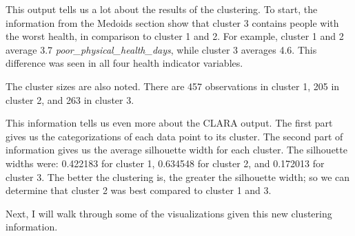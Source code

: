 \documentclass[12pt,twoside]{amherstthesis}
\begin{document}
  This output tells us a lot about the results of the clustering. To
  start, the information from the Medoids section show that cluster 3
  contains people with the worst health, in comparison to cluster 1 and 2.
  For example, cluster 1 and 2 average 3.7
  \emph{poor\_physical\_health\_days}, while cluster 3 averages 4.6. This
  difference was seen in all four health indicator variables.
  
  The cluster sizes are also noted. There are 457 observations in cluster
  1, 205 in cluster 2, and 263 in cluster 3.
  
  \begin{Shaded}
  \begin{Highlighting}[]
  
  \OperatorTok{$}
  \OperatorTok{$}
  \end{Highlighting}
  \end{Shaded}
  
  This information tells us even more about the CLARA output. The first
  part gives us the categorizations of each data point to its cluster. The
  second part of information gives us the average silhouette width for
  each cluster. The silhouette widths were: 0.422183 for cluster 1,
  0.634548 for cluster 2, and 0.172013 for cluster 3. The better the
  clustering is, the greater the silhouette width; so we can determine
  that cluster 2 was best compared to cluster 1 and 3.
  
  Next, I will walk through some of the visualizations given this new
  clustering information.
  
  \begin{Shaded}
  \begin{Highlighting}[]
  \OperatorTok{$}
  \OperatorTok{$} \OperatorTok{:}\NormalTok{, } \NormalTok{)}
  \end{Highlighting}
  \end{Shaded}
  
\end{document}
